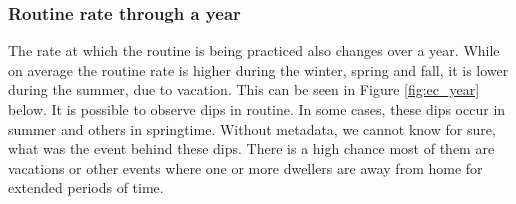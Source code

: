 \subsubsection{Routine rate through a year}

The rate at which the routine is being practiced also changes over a year. 
While on average the routine rate is higher during the winter, spring and fall, it is lower during the summer, due to vacation. 
This can be seen in Figure \ref{fig:ec_year} below. 
It is possible to observe dips in routine. 
In some cases, these dips occur in summer and others in springtime. 
Without metadata, we cannot know for sure, what was the event behind these dips. 
There is a high chance most of them are vacations or other events where one or more dwellers are away from home for extended periods of time. 

